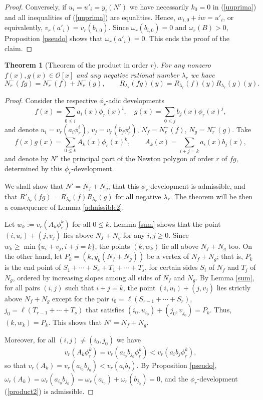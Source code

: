 \documentclass{amsart}
\newtheorem{theorem}{Theorem}[section]
\def\la{\lambda}
\def\om{\omega}
\def\oo{{\mathcal O}}
\def\zpx{\oo[x]}
\begin{document}
\begin{proof}
Conversely, if $u_i=u'_i=y_i(N')$ we have necessarily $k_0=0$ in (\ref{uuprima}) and all inequalities of (\ref{uuprima}) are equalities. Hence, $w_{i,0}+iw=u'_i$, or equivalently, $v_r(a'_i)=v_r(b_{i,0})$. Since $\om_r(b_{i,0})=0$ and $\om_r(B)>0$, Proposition \ref{pseudo} shows that $\om_r(a'_i)=0$. This ends the proof of the claim.
\end{proof}

\begin{theorem}[Theorem of the product in order $r$]For any nonzero $f(x),g(x)\in\zpx$ and any negative rational number $\la_r$ we have
 $$N_r^-(fg)=N_r^-(f)+N_r^-(g),\qquad R_{\la_r}(fg)(y)=R_{\la_r}(f)(y)R_{\la_r}(g)(y).$$
\end{theorem}

\begin{proof}
Consider the respective $\phi_r$-adic developments
$$
f(x)=\sum_{0\le i}a_i(x)\phi_r(x)^i,\quad
g(x)=\sum_{0\le j}b_j(x)\phi_r(x)^j,
$$and denote $u_i=v_r(a_i\phi_r^i)$, $v_j=v_r(b_j\phi_r^j)$, $N_f=N_r^-(f)$, $N_g=N_r^-(g)$. Take
\begin{equation}\label{product2}
f(x)g(x)=\sum_{0\le k}A_k(x)\phi_r(x)^k,\qquad
A_k(x)=\sum_{i+j=k}a_i(x)b_j(x),
\end{equation}
and denote by $N'$ the principal part of the Newton polygon of order $r$ of $fg$, determined by this $\phi_r$-development.

We shall show that $N'=N_f+N_g$, that this $\phi_r$-development is admissible, and that $R'_{\la_r}(fg)=R_{\la_r}(f)R_{\la_r}(g)$ for all negative $\la_r$. The theorem will be then a
consequence of Lemma \ref{admissible2}.

Let $w_k:=v_r(A_k\phi_r^ k)$ for all $0\le k$. Lemma
\ref{sum} shows that the point $(i,u_i)+(j,v_j)$ lies above $N_f+N_g$
for any $i,j\ge 0$. Since $w_k\ge
\min\{u_i+v_j,i+j=k\}$, the points $(k,w_k)$ lie all above $N_f+N_g$ too.
On the other hand, let $P_k=(k,y_k(N_f+N_g))$ be a vertex of $N_f+N_g$; that is, $P_k$ is the end point
of $S_1+\cdots+S_r+T_1+\cdots+T_s$, for certain sides $S_i$ of $N_f$ and $T_j$ of $N_g$, ordered by increasing slopes among all sides of $N_f$ and $N_g$. By Lemma \ref{sum}, for all
pairs $(i,j)$ such that $i+j=k$, the point $(i,u_i)+(j,v_j)$ lies
strictly above $N_f+N_g$ except for the pair
$i_0=\ell(S_{r-1}+\cdots+S_r)$, $j_0=\ell(T_{r-1}+\cdots+T_s)$ that
satisfies $(i_0,u_{i_0})+(j_0,v_{j_0})=P_k$. Thus,
$(k,w_k)=P_k$. This shows that $N'=N_f+N_g$.

Moreover, for all $(i,j)\ne(i_0,j_0)$ we have 
$$v_r(A_k\phi_r^k)=v_r(a_{i_0}b_{j_0}\phi_r^k)<v_r(a_ib_j\phi_r^k),
$$
so that $v_r(A_k)=v_r(a_{i_0}b_{j_0})<v_r(a_ib_j)$. By Proposition \ref{pseudo}, $\om_r(A_k)=\om_r(a_{i_0}b_{j_0})=\om_r(a_{i_0})+\om_r(b_{j_0})=0$, and the $\phi_r$-development (\ref{product2}) is admissible.


\end{proof}
\end{document}
